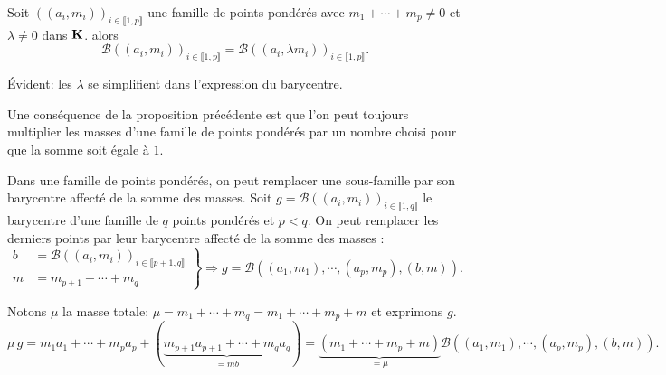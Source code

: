 \begin{prop}
Soit $((a_i,m_i))_{i\in\llbracket 1,p \rrbracket}$ une famille de points pondérés avec $m_1 + \cdots + m_p\neq 0$ et $\lambda\neq 0$ dans $\mathbf{K}$. alors
\begin{displaymath}
  \mathcal{B}((a_i,m_i))_{i\in\llbracket 1,p \rrbracket}
  = \mathcal{B}((a_i,\lambda m_i))_{i\in\llbracket 1,p \rrbracket}.
\end{displaymath}
\end{prop}
\begin{demo}
  \'Evident: les $\lambda$ se simplifient dans l'expression du barycentre.
\end{demo}
\begin{rem}
  Une conséquence de la proposition précédente est que l'on peut toujours multiplier les masses d'une famille de points pondérés par un nombre choisi pour que la somme soit égale à $1$.
\end{rem}
\begin{prop}
  Dans une famille de points pondérés, on peut remplacer une sous-famille par son barycentre affecté de la somme des masses.\newline
  Soit $g = \mathcal{B}((a_i,m_i))_{i\in\llbracket 1,q \rrbracket}$ le barycentre d'une famille de $q$ points pondérés et $p < q$. On peut remplacer les derniers points par leur barycentre affecté de la somme des masses : 
\begin{displaymath}
\left. 
\begin{aligned}
b &= \mathcal{B}((a_i,m_i))_{i\in\llbracket p+1,q \rrbracket}\\
m &= m_{p+1} + \cdots + m_q  
\end{aligned}
\right\rbrace \Rightarrow
g = \mathcal{B}\left((a_1,m_1),\cdots, (a_p,m_p),(b,m) \right) .
\end{displaymath}
\end{prop}
\begin{demo}
  Notons $\mu$ la masse totale: $\mu = m_1 + \cdots + m_q = m_1 + \cdots + m_p + m$ et exprimons $g$.
\[
 \mu\,g = m_1a_1 + \cdots + m_pa_p + \left(\underset{= m b}{ \underbrace{m_{p+1}a_{p+1} + \cdots + m_qa_q}}\right) 
 = \underset{= \mu}{\underbrace{(m_1 + \cdots + m_p + m)}}\mathcal{B}\left((a_1,m_1),\cdots, (a_p,m_p),(b,m) \right) .
\]

\end{demo}

